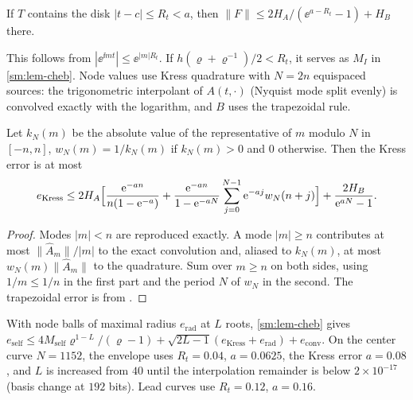 \begin{lemma}\label{sm:lem-self}
If $T$ contains the disk $|t-c|\le R_t<a$, then $\|F\|\le2H_A/(\ee^{a-R_t}-1)+H_B$ there.
\end{lemma}

This follows from $|\ee^{\ii mt}|\le\ee^{|m|R_t}$. If $h(\varrho+\varrho^{-1})/2<R_t$,
it serves as $M_I$ in \cref{sm:lem-cheb}. Node values use Kress quadrature with
$N=2n$ equispaced sources: the trigonometric interpolant of $A(t,\cdot)$ (Nyquist
mode split evenly) is convolved exactly with the logarithm, and $B$ uses the
trapezoidal rule.

\begin{lemma}\label{sm:lem-kress}
Let $k_N(m)$ be the absolute value of the representative of $m$ modulo $N$ in
$[-n,n]$, $w_N(m)=1/k_N(m)$ if $k_N(m)>0$ and $0$ otherwise. Then the Kress error
is at most
\[
  e_{\mathrm{Kress}}\le2H_A\Bigl[\frac{\mathrm{e}^{-an}}{n(1-\mathrm{e}^{-a})}
  +\frac{\mathrm{e}^{-an}}{1-\mathrm{e}^{-aN}}\sum_{j=0}^{N-1}\mathrm{e}^{-aj}w_N(n+j)\Bigr]
  +\frac{2H_B}{\mathrm{e}^{aN}-1}.
\]
\end{lemma}

\begin{proof}
Modes $|m|<n$ are reproduced exactly. A mode $|m|\ge n$ contributes at most
$\|\widehat A_m\|/|m|$ to the exact convolution and, aliased to $k_N(m)$, at most
$w_N(m)\|\widehat A_m\|$ to the quadrature. Sum over $m\ge n$ on both sides, using
$1/m\le1/n$ in the first part and the period $N$ of $w_N$ in the second. The
trapezoidal error is from \cite[Thm.~3.2]{TrefethenWeideman2014}.
\end{proof}

With node balls of maximal radius $e_{\mathrm{rad}}$ at $L$ roots,
\cref{sm:lem-cheb} gives
$e_{\mathrm{self}}\le4M_{\mathrm{self}}\varrho^{1-L}/(\varrho-1)+\sqrt{2L-1}(e_{\mathrm{Kress}}
+e_{\mathrm{rad}})+e_{\mathrm{conv}}$. On the center curve $N=1152$, the envelope uses
$R_t=0.04$, $a=0.0625$, the Kress error $a=0.08$, and $L$ is increased from $40$
until the interpolation remainder is below $2\times10^{-17}$ (basis change at $192$
bits). Lead curves use $R_t=0.12$, $a=0.16$.

